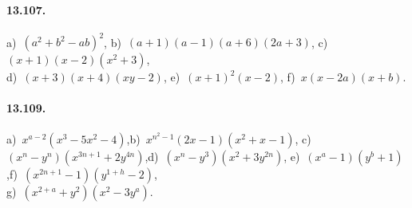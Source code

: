 \paragraph{13.107.}
a)~$\left(a^{2}+b^{2}-ab\right)^{2}$,\quad
b)~$(a+1)(a-1)(a+6)(2a+3)$,\quad
c)~$(x+1)(x-2)\left(x^{2}+3\right)$,\protect\\
d)~$(x+3)(x+4)(xy-2)$,\quad 
e)~$(x+1)^{2}(x-2)$,\quad
f)~$x(x-2a)(x+b)$.

\paragraph{13.109.} a)~$x^{a-2}(x^{3}-5x^{2}-4)$,\quad b)~$x^{n^{2}-1}(2x-1)(x^{2}+x-1)$,\quad
c)~$(x^{n}-y^{n})(x^{3n+1}+2y^{4n})$,\quad d)~$(x^{n}-y^{3})(x^{2}+3y^{2n})$,\quad
e)~$(x^{a}-1)(y^{b}+1)$,\quad f)~$(x^{2n+1}-1)(y^{1+h}-2)$,\protect\\
g)~$(x^{2+a}+y^{2})(x^{2}-3y^{a})$.
